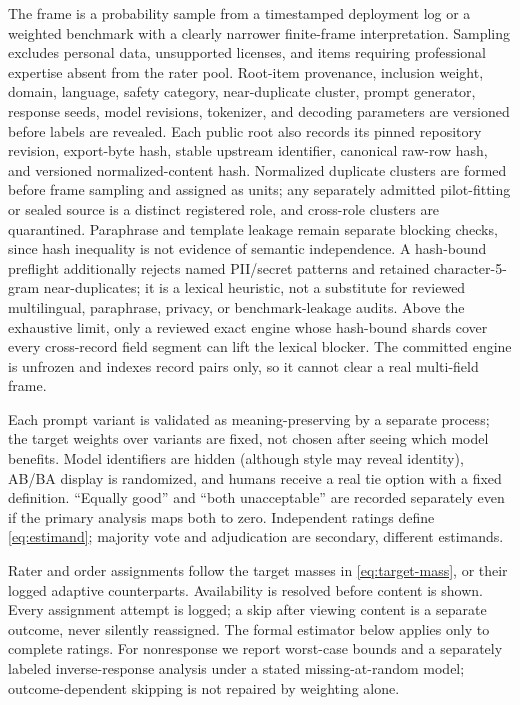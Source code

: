 \documentclass{article}
\begin{document}
The frame is a probability sample from a timestamped deployment log or a
weighted benchmark with a clearly narrower finite-frame interpretation.
Sampling excludes personal data, unsupported licenses, and items requiring
professional expertise absent from the rater pool. Root-item provenance,
inclusion weight, domain, language, safety category, near-duplicate cluster,
prompt generator, response seeds, model revisions, tokenizer, and decoding
parameters are versioned before labels are revealed.
Each public root also records its pinned repository revision, export-byte hash,
stable upstream identifier, canonical raw-row hash, and versioned
normalized-content hash. Normalized duplicate clusters are formed before frame
sampling and assigned as units; any separately admitted pilot-fitting or
sealed source is a distinct registered role, and cross-role clusters are
quarantined. Paraphrase and template leakage remain separate blocking checks,
since hash inequality is not evidence of semantic independence. A hash-bound
preflight additionally rejects named PII/secret patterns and retained
character-5-gram near-duplicates; it is a lexical heuristic, not a substitute
for reviewed multilingual, paraphrase, privacy, or benchmark-leakage audits.
Above the exhaustive limit, only a reviewed exact engine whose hash-bound
shards cover every cross-record field segment can lift the lexical blocker.
The committed engine is unfrozen and indexes record pairs only, so it cannot
clear a real multi-field frame.

Each prompt variant is validated as meaning-preserving by a separate process;
the target weights over variants are fixed, not chosen after seeing which model
benefits. Model identifiers are hidden (although style may reveal identity),
AB/BA display is randomized, and humans
receive a real tie option with a fixed definition. ``Equally good'' and ``both
unacceptable'' are recorded separately even if the primary analysis maps both
to zero. Independent ratings define \cref{eq:estimand}; majority vote and
adjudication are secondary, different estimands.

Rater and order assignments follow the target masses in
\cref{eq:target-mass}, or their logged adaptive counterparts. Availability is
resolved before content is shown. Every assignment attempt is logged; a skip
after viewing content is a separate outcome, never silently reassigned. The
formal estimator below applies only to complete ratings. For nonresponse we
report worst-case bounds and a separately labeled inverse-response analysis
under a stated missing-at-random model; outcome-dependent skipping is not
repaired by weighting alone.
\end{document}
